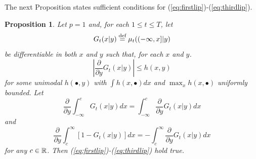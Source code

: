 \documentclass{article}              %
\newtheorem{proposition}{Proposition}
\begin{document}
\noindent The next Proposition states sufficient conditions for (\ref{eq:firstlip})-(\ref{eq:thirdlip}).
\begin{proposition}
\label{lem:dif}Let $p=1$ and, for each $1\leq t\leq T$, let 
\[
G_{t}(x|y)\stackrel{\text{\rm def}}{=}\mu_{t}((-\infty,x]|y)
\]
be differentiable in both $x$ and $y$ such that, for each $x$ and $y$.
\[
\left|\frac{\partial}{\partial y}G_{t}(x|y)\right|\leq h(x,y)
\]
for some unimodal $h(\bullet,y)$ with $\int h(x,\bullet)dx$ and
$\max_{x}h(x,\bullet)$ uniformly bounded. Let 
$$\frac{\partial}{\partial y}\int_{-\infty}^{c}G_{t}(x|y)dx=\int_{-\infty}^{c}\frac{\partial}{\partial y}G_{t}(x|y)dx$$
and 
$$\frac{\partial}{\partial y}\int_{c}^{\infty}[1-G_{t}(x|y)]dx=-\int_{c}^{\infty}\frac{\partial}{\partial y}G_{t}(x|y)dx$$
for any $c\in\mathbb{R}$. Then (\ref{eq:firstlip})-(\ref{eq:thirdlip})
hold true. 
\end{proposition}
\end{document}
